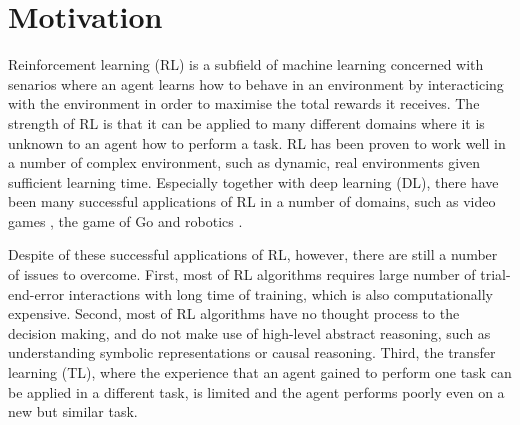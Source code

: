 \section{Motivation}
\label{sec:motivation}
Reinforcement learning (RL) is a subfield of machine learning concerned with senarios where an agent learns how to behave in an environment by interacticing with the environment in order to maximise the total rewards it receives.
The strength of RL is that it can be applied to many different domains where it is unknown to an agent how to perform a task. 
RL has been proven to work well in a number of complex environment, such as dynamic, real environments given sufficient learning time.
Especially together with deep learning (DL), there have been many successful applications of RL in a number of domains,
such as video games \cite{Mnih2015}, the game of Go \cite{Silver2016} and robotics \cite{Levine2015}. 

Despite of these successful applications of RL, however, there are still a number of issues to overcome.
First, most of RL algorithms requires large number of trial-end-error interactions with long time of training, which is also computationally expensive.
Second, most of RL algorithms have no thought process to the decision making, and do not make use of high-level abstract reasoning, 
such as understanding symbolic representations or causal reasoning.
Third, the transfer learning (TL), where the experience that an agent gained to perform one task can be applied in a different task, is limited and the agent performs poorly even on a new but similar task. 

